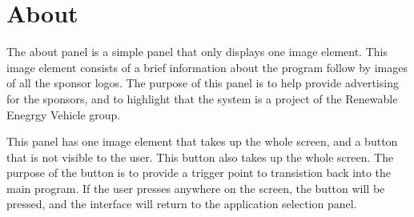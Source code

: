 

\section{About}

The about panel is a simple panel that only displays one image element. This image element consists of a brief information about the program follow by images of all the sponsor logos. The purpose of this panel is to help provide advertising for the sponsors, and to highlight that the system is a project of the Renewable Enegrgy Vehicle group.

This panel has one image element that takes up the whole screen, and a button that is not visible to the user. This button also takes up the whole screen. The purpose of the button is to provide a trigger point to transistion back into the main program. If the user presses anywhere on the screen, the button will be pressed, and the interface will return to the application selection panel.




